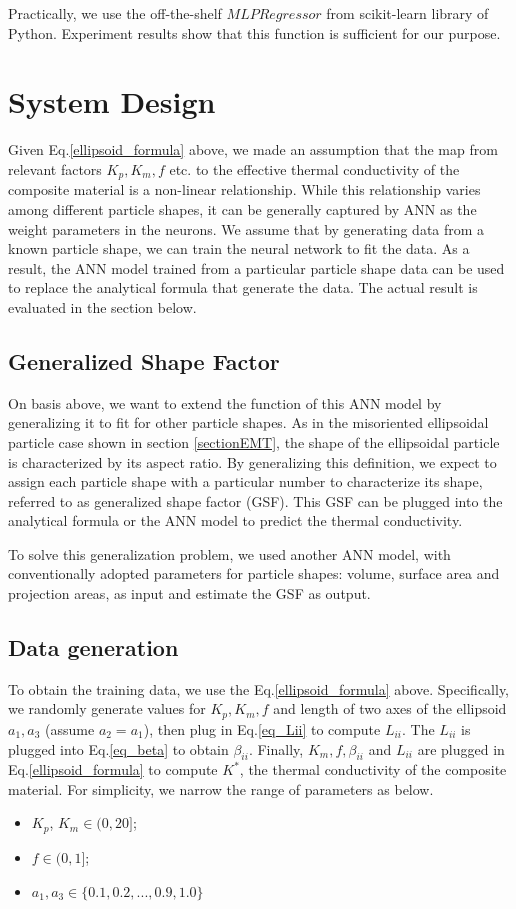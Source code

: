 \documentclass[conference,compsoc]{IEEEtran}
\begin{document}
Practically, we use the off-the-shelf $MLPRegressor$ from scikit-learn library of Python. Experiment results show that this function is sufficient for our purpose.

\section{System Design}
Given Eq.\ref{ellipsoid_formula} above, we made an assumption that the map from relevant factors $K_p, K_m, f$ etc. to the effective thermal conductivity of the composite material is a non-linear relationship. While this relationship varies among different particle shapes, it can be generally captured by ANN as the weight parameters in the neurons. We assume that by generating data from a known particle shape, we can train the neural network to fit the data. As a result, the ANN model trained from a particular particle shape data can be used to replace the analytical formula that generate the data. The actual result is evaluated in the section below.

\subsection{Generalized Shape Factor}
On basis above, we want to extend the function of this ANN model by generalizing it to fit for other particle shapes. As in the misoriented ellipsoidal particle case shown in section \ref{sectionEMT}, the shape of the ellipsoidal particle is characterized by its aspect ratio. By generalizing this definition, we expect to assign each particle shape with a particular number to characterize its shape, referred to as generalized shape factor (GSF). This GSF can be plugged into the analytical formula or the ANN model to predict the thermal conductivity. 

To solve this generalization problem, we used another ANN model, with conventionally adopted parameters for particle shapes: volume, surface area and projection areas, as input and estimate the GSF as output.

\subsection{Data generation}
To obtain the training data, we use the Eq.\ref{ellipsoid_formula} above. Specifically, we randomly generate values for $K_p, K_m, f$ and length of two axes of the ellipsoid $a_1, a_3$ (assume $a_2 = a_1$), then plug in Eq.\ref{eq_Lii} to compute $L_{ii}$. The $L_{ii}$ is plugged into Eq.\ref{eq_beta} to obtain $\beta_{ii}$. Finally, $K_m, f, \beta_{ii}$ and $L_{ii}$ are plugged in Eq.\ref{ellipsoid_formula} to compute $K^*$, the thermal conductivity of the composite material. For simplicity, we narrow the range of parameters as below.
\begin{itemize}
\item $K_p$, $K_m \in (0, 20]$;
\item $f \in (0,1]$;
\item $a_1, a_3 \in \lbrace0.1, 0.2, ..., 0.9, 1.0\rbrace$
\end{itemize}
\end{document}
